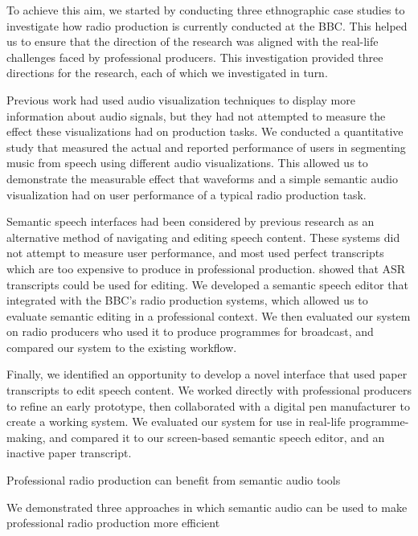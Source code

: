 
To achieve this aim, we started by conducting three ethnographic case studies to investigate how radio production is
currently conducted at the BBC. This helped us to ensure that the direction of the research was aligned with the
real-life challenges faced by professional producers.  This investigation provided three directions for the research,
each of which we investigated in turn.

Previous work had used audio visualization techniques to display more information about audio signals, but they had not
attempted to measure the effect these visualizations had on production tasks.
We conducted a quantitative study that measured the actual and reported performance of users in segmenting music from
speech using different audio visualizations.
This allowed us to demonstrate the measurable effect that waveforms and a simple semantic audio visualization had on
user performance of a typical radio production task.

Semantic speech interfaces had been considered by previous research as an alternative method of navigating and
editing speech content.
These systems did not attempt to measure user performance, and most used perfect transcripts which are too expensive to
produce in professional production. \citet{Whittaker2004} showed that ASR transcripts could be used for editing.
We developed a semantic speech editor that integrated with the BBC's radio production systems, which allowed us to
evaluate semantic editing in a professional context.
We then evaluated our system on radio producers who used it to produce programmes for broadcast, and compared our
system to the existing workflow.

Finally, we identified an opportunity to develop a novel interface that used paper transcripts to edit speech content.
We worked directly with professional producers to refine an early prototype, then collaborated with a digital pen
manufacturer to create a working system.
We evaluated our system for use in real-life programme-making, and compared it to our screen-based semantic speech
editor, and an inactive paper transcript.


Professional radio production can benefit from semantic audio tools

We demonstrated three approaches in which semantic audio can be used to make professional radio production more
efficient

